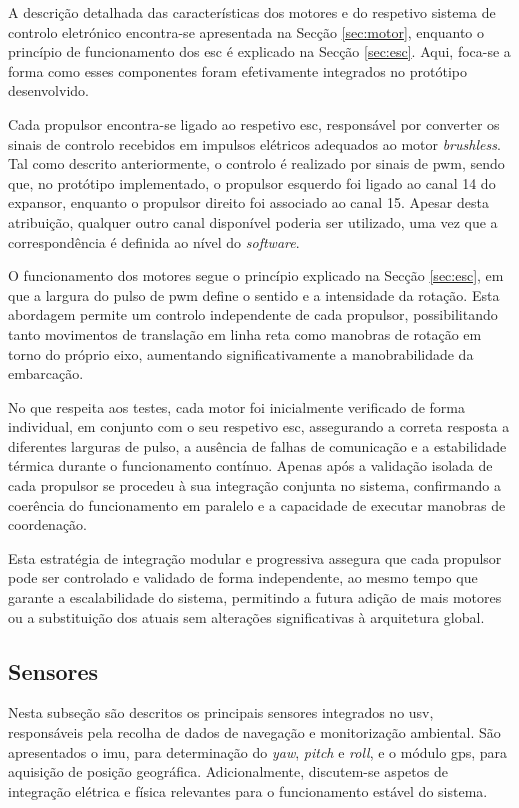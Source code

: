 A descrição detalhada das características dos motores e do respetivo sistema de controlo eletrónico encontra-se apresentada na Secção \ref{sec:motor}, enquanto o princípio de funcionamento dos \gls{esc} é explicado na Secção \ref{sec:esc}. Aqui, foca-se a forma como esses componentes foram efetivamente integrados no protótipo desenvolvido.  

Cada propulsor encontra-se ligado ao respetivo \gls{esc}, responsável por converter os sinais de controlo recebidos em impulsos elétricos adequados ao motor \emph{brushless}. Tal como descrito anteriormente, o controlo é realizado por sinais de \gls{pwm}, sendo que, no protótipo implementado, o propulsor esquerdo foi ligado ao canal 14 do expansor, enquanto o propulsor direito foi associado ao canal 15. Apesar desta atribuição, qualquer outro canal disponível poderia ser utilizado, uma vez que a correspondência é definida ao nível do \emph{software}.  

O funcionamento dos motores segue o princípio explicado na Secção \ref{sec:esc}, em que a largura do pulso de \gls{pwm} define o sentido e a intensidade da rotação. Esta abordagem permite um controlo independente de cada propulsor, possibilitando tanto movimentos de translação em linha reta como manobras de rotação em torno do próprio eixo, aumentando significativamente a manobrabilidade da embarcação.  

No que respeita aos testes, cada motor foi inicialmente verificado de forma individual, em conjunto com o seu respetivo \gls{esc}, assegurando a correta resposta a diferentes larguras de pulso, a ausência de falhas de comunicação e a estabilidade térmica durante o funcionamento contínuo. Apenas após a validação isolada de cada propulsor se procedeu à sua integração conjunta no sistema, confirmando a coerência do funcionamento em paralelo e a capacidade de executar manobras de coordenação.  

Esta estratégia de integração modular e progressiva assegura que cada propulsor pode ser controlado e validado de forma independente, ao mesmo tempo que garante a escalabilidade do sistema, permitindo a futura adição de mais motores ou a substituição dos atuais sem alterações significativas à arquitetura global.

\subsection{Sensores}
\label{subsec:sensores}

Nesta subseção são descritos os principais sensores integrados no \gls{usv}, responsáveis pela recolha de dados de navegação e monitorização ambiental. São apresentados o \gls{imu}, para determinação do \emph{yaw}, \emph{pitch} e \emph{roll}, e o módulo \gls{gps}, para aquisição de posição geográfica. Adicionalmente, discutem-se aspetos de integração elétrica e física relevantes para o funcionamento estável do sistema.

